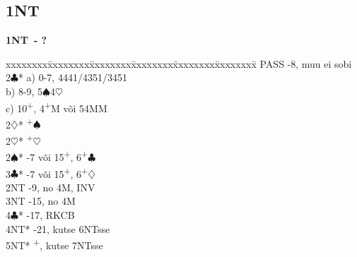 \documentclass[10pt]{article}
\renewcommand{\c}{$\clubsuit$}
\renewcommand{\d}{$\diamondsuit$}
\newcommand{\h}{$\heartsuit$}
\newcommand{\s}{$\spadesuit$}
\newcommand{\p}{\textsuperscript{+}}
\newenvironment{bidtable}[1][]
{\textbf{#1}
  \begin{adjustwidth}{1em}{}
    \addvspace{2pt}
    \begin{tabbing}
      xxxxxxxx\=xxxxxxxx\=xxxxxxxx\=xxxxxxxx\=xxxxxxxx\=xxxxxxxx\=\kill}
{\end{tabbing}\end{adjustwidth}\bigskip}%
\begin{document}
\begin{multicols*}{2}

\newpage
\subsection{1NT}

\begin{bidtable}[1NT\ - ?]
PASS   -8, muu ei sobi        \\
2\c*   \> a) 0-7, 4441/4351/3451  \\
       \> b) 8-9, 5\s 4\h         \\
       \> c) 10\p, 4\p M või 54MM \\
2\d*   {}\p\s                   \\
2\h*   {}\p\h                   \\
2\s*   {}-7 või 15\p, 6\p\c     \\
3\c*   {}-7 või 15\p, 6\p\d     \\
2NT    -9, no 4M, INV         \\
3NT    -15, no 4M            \\
4\c*   {}-17, RKCB             \\
4NT*   -21, kutse 6NTsse     \\
5NT*   \p, kutse 7NTsse
\end{bidtable}


\end{multicols*}
\end{document}
